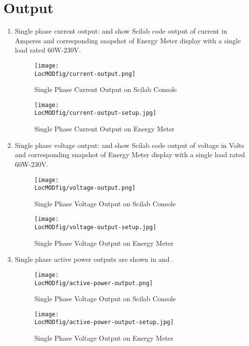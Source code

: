 \section{Output}

\begin{enumerate}
\item Single phase current output:
 and  show Scilab code output of current in Amperes and corresponding snapshot of Energy Meter display with a single load rated 60W-230V.

\begin{figure}
\centering
\texttt{[image: \\LocMODfig/current-output.png]}
\caption{Single Phase Current Output on Scilab Console}
\label{fig:current-console}
\end{figure}

\begin{figure}
\centering
\texttt{[image: \\LocMODfig/current-output-setup.jpg]}
\caption{Single Phase Current Output on Energy Meter}
\label{fig:current-meter}
\end{figure}

\item Single phase voltage output:
 and  show Scilab code output of voltage in Volts and corresponding snapshot of Energy Meter display with a single load rated 60W-230V.

\begin{figure}
\centering
\texttt{[image: \\LocMODfig/voltage-output.png]}
\caption{Single Phase Voltage Output on Scilab Console}
\label{fig:voltage-console}
\end{figure}

\begin{figure}
\centering
\texttt{[image: \\LocMODfig/voltage-output-setup.jpg]}
\caption{Single Phase Voltage Output on Energy Meter}
\label{fig:voltage-meter}
\end{figure}

\item Single phase active power  outputs are shown in  and .

\begin{figure}
\centering
\texttt{[image: \\LocMODfig/active-power-output.png]}
\caption{Single Phase Voltage Output on Scilab Console}
\label{fig:power-console}
\end{figure}

\begin{figure}
\centering
\texttt{[image: \\LocMODfig/active-power-output-setup.jpg]}
\caption{Single Phase Voltage Output on Energy Meter}
\label{fig:power-meter}
\end{figure}

\end{enumerate}


